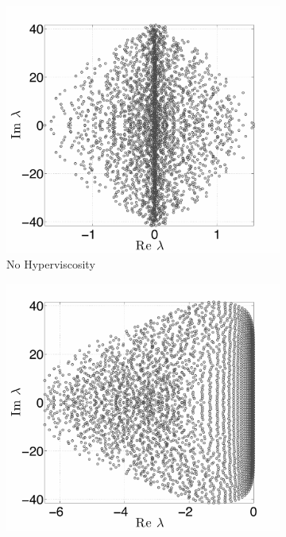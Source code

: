 \documentclass{report}
\begin{document}
\begin{figure}[ht!]
\begin{center}
\begin{subfigure}[b]{0.45\textwidth}
	\centering
	\includegraphics[width=1.0\textwidth]{../figures/paper1/figures/cosine_bell/eigs_N4096_n101_noHV_SCALED.pdf}
	\caption{No Hyperviscosity}
	\label{fig:cosine_eigs_nohv}
\end{subfigure}
\begin{subfigure}[b]{0.45\textwidth}
	\includegraphics[width=1.0\textwidth]{../figures/paper1/figures/cosine_bell/eigs_HV_N4096_n101_k8_gamma5e_m2_SCALED.pdf}

\end{subfigure}
\end{center}
\end{figure}
\end{document}

